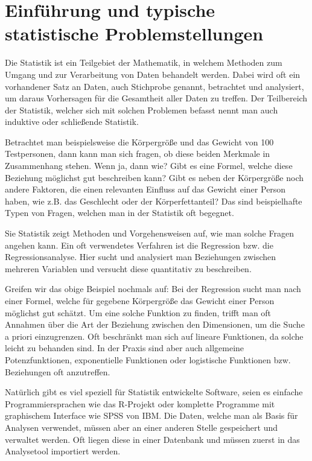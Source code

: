 \chapter{Einführung und typische statistische Problemstellungen}
\label{chapter:1}

Die Statistik ist ein Teilgebiet der Mathematik, in welchem Methoden zum Umgang und zur Verarbeitung von Daten behandelt werden. Dabei wird oft ein vorhandener Satz an Daten, auch Stichprobe genannt, betrachtet und analysiert, um daraus Vorhersagen für die Gesamtheit aller Daten zu treffen. Der Teilbereich der Statistik, welcher sich mit solchen Problemen befasst nennt man auch induktive oder schließende Statistik.

Betrachtet man beispielsweise die Körpergröße und das Gewicht von 100 Testpersonen, dann kann man sich fragen, ob diese beiden Merkmale in Zusammenhang stehen. Wenn ja, dann wie? Gibt es eine Formel, welche diese Beziehung möglichst gut beschreiben kann? Gibt es neben der Körpergröße noch andere Faktoren, die einen relevanten Einfluss auf das Gewicht einer Person haben, wie z.B. das Geschlecht oder der Körperfettanteil? Das sind beispielhafte Typen von Fragen, welchen man in der Statistik oft begegnet.

Sie Statistik zeigt Methoden und Vorgehensweisen auf, wie man solche Fragen angehen kann. Ein oft verwendetes Verfahren ist die Regression bzw. die Regressionsanalyse. Hier sucht und analysiert man Beziehungen zwischen mehreren Variablen und versucht diese quantitativ zu beschreiben.

Greifen wir das obige Beispiel nochmals auf: Bei der Regression sucht man nach einer Formel, welche für gegebene Körpergröße das Gewicht einer Person möglichst gut schätzt. Um eine solche Funktion zu finden, trifft man oft Annahmen über die Art der Beziehung zwischen den Dimensionen, um die Suche a priori einzugrenzen. Oft beschränkt man sich auf lineare Funktionen, da solche leicht zu behanden sind. In der Praxis sind aber auch allgemeine Potenzfunktionen, exponentielle Funktionen oder logistische Funktionen bzw. Beziehungen oft anzutreffen.

Natürlich gibt es viel speziell für Statistik entwickelte Software, seien es einfache Programmiersprachen wie das R-Projekt oder komplette Programme mit graphischem Interface wie SPSS von IBM. Die Daten, welche man als Basis für Analysen verwendet, müssen aber an einer anderen Stelle gespeichert und verwaltet werden. Oft liegen diese in einer Datenbank und müssen zuerst in das Analysetool importiert werden.

